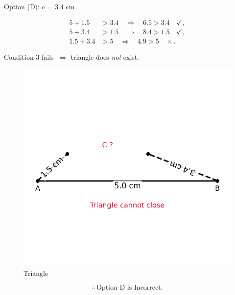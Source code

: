 \documentclass[journal]{IEEEtran}
\begin{document}
\bigskip

Option (D): c = 3.4 cm

\begin{align}
5 + 1.5 &> 3.4 \quad\Rightarrow\quad 6.5 > 3.4\quad\checkmark,\\
5 + 3.4 &> 1.5 \quad\Rightarrow\quad 8.4 > 1.5\quad\checkmark,\\
1.5 + 3.4 &> 5 \quad\Rightarrow\quad 4.9 > 5\quad\times.
\end{align}

Condition 3 fails $\;\Rightarrow$ triangle does \emph{not} exist.

\begin{figure}[htbp]
\centering
\includegraphics[width=0.5\columnwidth]{figs/fig4.png}
\caption{Triangle}
\label{fig:figs/fig4.png}
\end{figure}

$$\boxed{\therefore \, \text{Option D is Incorrect.}}$$
\end{document}
